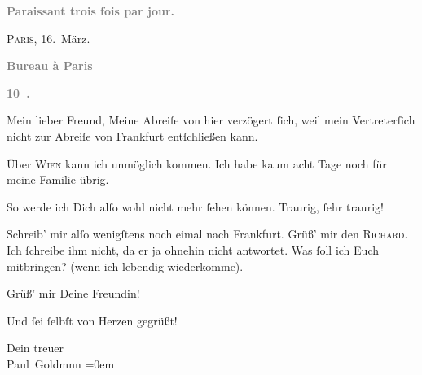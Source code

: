 \pstart
           \begin{otherlanguage}{french}\textcolor{gray}{\textbf{\textbf{Paraissant trois fois par jour.}}}\end{otherlanguage}\hfill \textsc{Paris}, 16. März.\pend
           
\pstart
           \begin{otherlanguage}{french}\textcolor{gray}{\textbf{\textbf{Bureau à Paris}}}\end{otherlanguage}\pend
           
\pstart
           \begin{otherlanguage}{french}\textcolor{gray}{\textbf{\textbf{10 .}}}\end{otherlanguage}\pend
           
\pstart\center{}Mein lieber Freund,\pend\vspace{0.5em}
\pstart
           Meine Abreiſe von hier
               verzögert{ }ſich, weil mein Vertreterſich nicht zur Abreiſe von Frankfurt entſchließen kann.\pend
           
\pstart
           Über \textsc{Wien} kann ich unmöglich kommen. Ich habe kaum acht Tage noch für meine Familie
               übrig.\pend
           
\pstart
           So werde ich Dich alſo wohl nicht mehr{ }ſehen können. Traurig,{ }ſehr traurig!\pend
           
\pstart
           {\pb}Schreib’ mir alſo wenigſtens noch eimal nach Frankfurt. Grüß’ mir den \textsc{Richard}. Ich{ }ſchreibe ihm nicht, da er ja ohnehin nicht antwortet. Was{ }ſoll ich Euch
               mitbringen? (wenn ich lebendig wiederkomme).\pend
           
\pstart
           Grüß’ mir Deine Freundin!\pend
           
\pstart
           Und{ }ſei{ }ſelbſt von Herzen gegrüßt!\pend
           
\pstart
           Dein treuer {\\[\baselineskip]}\spacefill\mbox{Paul Goldmnn}\pend
           \leftskip=0em{}\endnumbering{}  \newcommand{\dateiname}{L02843}\newcommand{\titel}{Paul Goldmann an Arthur Schnitzler, 16. 3. [1898]}\newcommand{\editorInnen}{Martin Anton Müller und Laura Untner}
